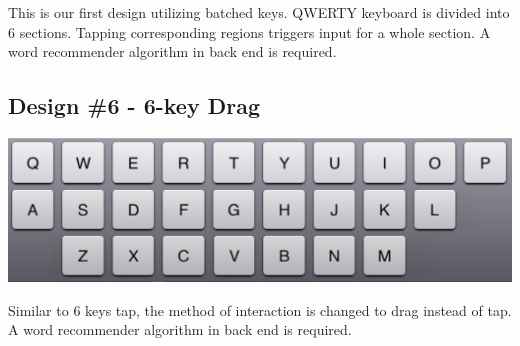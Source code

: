 This is our first design utilizing batched keys. QWERTY keyboard is divided into 6 sections. Tapping corresponding regions triggers input for a whole section.
A word recommender algorithm in back end is required.


\subsection{Design \#6 - 6-key Drag}
\vspace*{.1cm}
\includegraphics[width=.9\columnwidth]{figures/26Tap}

Similar to 6 keys tap, the method of interaction is changed to drag instead of tap.
A word recommender algorithm in back end is required.


